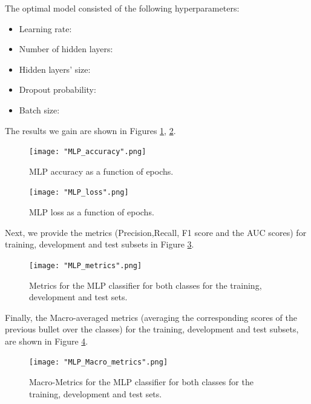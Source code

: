 \documentclass[10pt, a4paper]{article}
\begin{document}
    The optimal model consisted of the following hyperparameters:
    \begin{itemize}
        \item Learning rate:
        \item Number of hidden layers:
        \item Hidden layers' size:
        \item Dropout probability:
        \item Batch size:
    \end{itemize}
    
    The results we gain are shown in Figures \ref{fig::mlp_accuracy}, \ref{fig::mlp_loss}.

    \begin{figure}
	    \centering
            \texttt{[image: "MLP\_accuracy".png]}
	    \caption{MLP accuracy as a function of epochs.}
	    \label{fig::mlp_accuracy}
    \end{figure}

    \begin{figure}
	    \centering
            \texttt{[image: "MLP\_loss".png]}
	    \caption{MLP loss as a function of epochs.}
	    \label{fig::mlp_loss}
	\end{figure}

    Next, we provide the metrics (Precision,Recall, F1 score and the AUC scores) for training, development and test subsets in Figure \ref{fig::mlp_metrics}.

    \begin{figure}
	    \centering
            \texttt{[image: "MLP\_metrics".png]}
	    \caption{Metrics for the MLP classifier for both classes for the training, development and test sets.}
	    \label{fig::mlp_metrics}
    \end{figure}

    Finally,  the Macro-averaged metrics (averaging the corresponding scores of the previous bullet over the classes) for the training, development and test subsets, are shown in Figure \ref{fig::mlp_macro_metrics}.

    \begin{figure}
	    \centering
            \texttt{[image: "MLP\_Macro\_metrics".png]}
	    \caption{Macro-Metrics for the MLP classifier for both classes for the training, development and test sets.}
	    \label{fig::mlp_macro_metrics}
    \end{figure}

    

	\printbibliography
	
\end{document}
